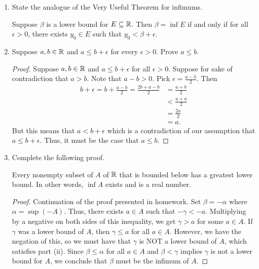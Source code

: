 \documentclass[11pt,a4paper]{article}
\begin{document}
\begin{enumerate}
 \item State the analogue of the Very Useful Theorem for infimums. \label{Problem 3}
     \begin{solution}
        Suppose \( \beta  \) is a lower bound for \( E \subseteq \mathbb{R}    \). Then \( \beta = \inf E  \) if and only if for all \( \epsilon > 0  \), there exists \( {y}_{0} \in E  \) such that \( {y}_{0} < \beta + \epsilon  \).
        \end{solution}
    \item Suppose \( a,b \in \mathbb{R}  \) and \( a \leq b + \epsilon  \) for every \( \epsilon > 0  \). Prove \( a \leq b  \). \label{Problem 5}
        \begin{proof}
        Suppose \( a, b \in \mathbb{R}  \) and \( a \leq b + \epsilon  \) for all \( \epsilon > 0  \). Suppose for sake of contradiction that \(  a > b  \). Note that \( a - b > 0   \). Pick \( \epsilon  = \frac{  a - b  }{  2  }  \). Then 
        \begin{align*}
            b  + \epsilon = b + \frac{ a - b  }{ 2 } = \frac{  2b + a - b }{ 2  }     
                                                     &= \frac{ a  +b  }{ 2  } \\ 
                                                     &< \frac{ a + a  }{ 2  } \\
                                                     &= \frac{ 2 a  }{  2  } \\
                                                     &= a.
        \end{align*}
        But this means that \( a < b + \epsilon  \) which is a contradiction of our assumption that \( a \leq b + \epsilon  \). Thus, it must be the case that \( a \leq b  \).
    \end{proof}
    \item Complete the following proof.   
\begin{theorem}
   Every nonempty subset of \( A  \) of \( \mathbb{R}  \) that is bounded below has a greatest lower bound. In other words, \( \inf A  \) exists and is a real number.   
\end{theorem}
\begin{proof}
Continuation of the proof presented in homework. Set \( \beta = - \alpha  \) where \(  \alpha  = \sup (-A )   \). Thus, there exists \( a \in A  \) such that \( - \gamma < - a  \). Multiplying by a negative on both sides of this inequality, we get \(  \gamma > a  \) for some \( a \in A  \). If \( \gamma  \) was a lower bound of \( A  \), then \( \gamma \leq a   \) for all \( a \in A  \). However, we have the negation of this, so we must have that \( \gamma  \) is NOT a lower bound of \( A  \), which satisfies part (ii). Since \( \beta \leq \alpha  \) for all \( a \in A  \) and \( \beta < \gamma  \) implies \( \gamma  \) is not a lower bound for \( A  \), we conclude that \( \beta  \) must be the infimum of \( A  \).  

\end{proof}
\end{enumerate}
\end{document}
